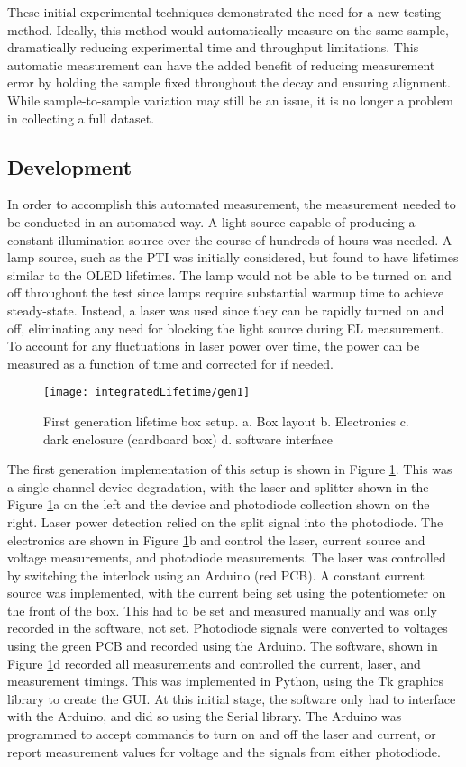 \documentclass[../thesis.tex]{subfiles}
\begin{document}
These initial experimental techniques demonstrated the need for a new testing method.
Ideally, this method would automatically measure \pl on the same sample, dramatically reducing experimental time and throughput limitations.
This automatic measurement can have the added benefit of reducing measurement error by holding the sample fixed throughout the decay and ensuring alignment.
While sample-to-sample variation may still be an issue, it is no longer a problem in collecting a full dataset.

\subsection{Development}

In order to accomplish this automated measurement, the \pl measurement needed to be conducted in an automated way.
A light source capable of producing a constant illumination source over the course of hundreds of hours was needed.
A lamp source, such as the PTI was initially considered, but found to have lifetimes similar to the OLED lifetimes.
The lamp would not be able to be turned on and off throughout the test since lamps require substantial warmup time to achieve steady-state.
Instead, a laser was used since they can be rapidly turned on and off, eliminating any need for blocking the light source during EL measurement.
To account for any fluctuations in laser power over time, the power can be measured as a function of time and corrected for if needed.

\begin{figure}[ht]
\centering
\texttt{[image: integratedLifetime/gen1]}
\caption{First generation lifetime box setup.  a.  Box layout  b. Electronics c. dark enclosure (cardboard box) d. software interface}
\label{fig:gen1}
\end{figure}

The first generation implementation of this setup is shown in Figure \ref{fig:gen1}.
This was a single channel device degradation, with the laser and splitter shown in the Figure \ref{fig:gen1}a on the left and the device and photodiode collection shown on the right.
Laser power detection relied on the split signal into the photodiode.
The electronics are shown in Figure \ref{fig:gen1}b and control the laser, current source and voltage measurements, and photodiode measurements.
The laser was controlled by switching the interlock using an Arduino (red PCB).
A constant current source was implemented, with the current being set using the potentiometer on the front of the box.  
This had to be set and measured manually and was only recorded in the software, not set.
Photodiode signals were converted to voltages using the green PCB and recorded using the Arduino. 
The software, shown in Figure \ref{fig:gen1}d recorded all measurements and controlled the current, laser, and measurement timings.
This was implemented in Python, using the Tk graphics library to create the GUI.  
At this initial stage, the software only had to interface with the Arduino, and did so using the Serial library.
The Arduino was programmed to accept commands to turn on and off the laser and current, or report measurement values for voltage and the signals from either photodiode.
\end{document}
